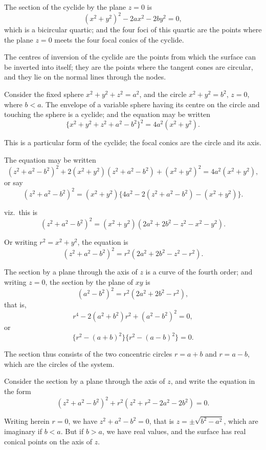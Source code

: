 \documentclass[11pt,a4paper]{article}
\theoremstyle{plain}
\theoremstyle{definition}
\theoremstyle{remark}
\begin{document}
The section of the cyclide by the plane $z = 0$ is
\[
(x^2 + y^2)^2 - 2ax^2 - 2by^2 = 0,
\]
which is a bicircular quartic; and the four foci of this quartic are the points where the plane $z = 0$ meets the four focal conics of the cyclide.

The centres of inversion of the cyclide are the points from which the surface can be inverted into itself; they are the points where the tangent cones are circular, and they lie on the normal lines through the nodes.

\newpage

Consider the fixed sphere $x^2 + y^2 + z^2 = a^2$, and the circle $x^2 + y^2 = b^2$, $z = 0$, where $b < a$. The envelope of a variable sphere having its centre on the circle and touching the sphere is a cyclide; and the equation may be written
\[
\{x^2 + y^2 + z^2 + a^2 - b^2\}^2 = 4a^2(x^2 + y^2).
\]

This is a particular form of the cyclide; the focal conics are the circle and its axis.

The equation may be written
\[
(z^2 + a^2 - b^2)^2 + 2(x^2 + y^2)(z^2 + a^2 - b^2) + (x^2 + y^2)^2 = 4a^2(x^2 + y^2),
\]
or say
\[
(z^2 + a^2 - b^2)^2 = (x^2 + y^2)\{4a^2 - 2(z^2 + a^2 - b^2) - (x^2 + y^2)\}.
\]

\newpage

viz.\ this is
\[
(z^2 + a^2 - b^2)^2 = (x^2 + y^2)(2a^2 + 2b^2 - z^2 - x^2 - y^2).
\]

Or writing $r^2 = x^2 + y^2$, the equation is
\[
(z^2 + a^2 - b^2)^2 = r^2(2a^2 + 2b^2 - z^2 - r^2).
\]

The section by a plane through the axis of $z$ is a curve of the fourth order; and writing $z = 0$, the section by the plane of $xy$ is
\[
(a^2 - b^2)^2 = r^2(2a^2 + 2b^2 - r^2),
\]
that is,
\[
r^4 - 2(a^2 + b^2)r^2 + (a^2 - b^2)^2 = 0,
\]
or
\[
\{r^2 - (a + b)^2\}\{r^2 - (a - b)^2\} = 0.
\]

The section thus consists of the two concentric circles $r = a + b$ and $r = a - b$, which are the circles of the system.

\newpage

Consider the section by a plane through the axis of $z$, and write the equation in the form
\[
(z^2 + a^2 - b^2)^2 + r^2(z^2 + r^2 - 2a^2 - 2b^2) = 0.
\]

Writing herein $r = 0$, we have $z^2 + a^2 - b^2 = 0$, that is $z = \pm\sqrt{b^2 - a^2}$, which are imaginary if $b < a$. But if $b > a$, we have real values, and the surface has real conical points on the axis of $z$.
\end{document}
